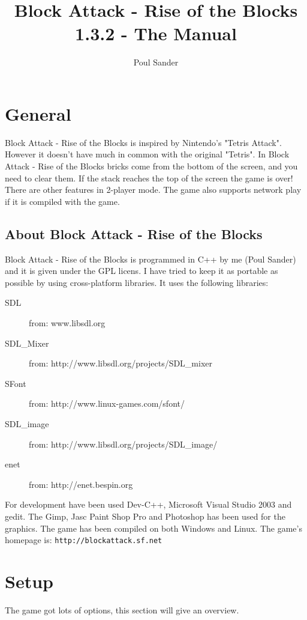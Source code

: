 \documentclass[11pt,a4paper]{article}
\begin{document}
\title{Block Attack - Rise of the Blocks 1.3.2 - The Manual}
\author{Poul Sander}
\maketitle
\tableofcontents
\section{General}
Block Attack - Rise of the Blocks is inspired by Nintendo's
"Tetris Attack". However it doesn't have much in common with the
original "Tetris". In Block Attack - Rise of the Blocks bricks
come from the bottom of the screen, and you need to clear them. If
the stack reaches the top of the screen the game is over! There
are other features in 2-player mode. The game also supports network play 
if it is compiled with the game.
\subsection{About Block Attack - Rise of the Blocks}
Block Attack - Rise of the Blocks is programmed in C++ by me (Poul
Sander) and it is given under the GPL licens. I have tried to keep
it as portable as possible by using cross-platform libraries. It
uses the following libraries:
\begin{description}
\item[SDL] from: \newline www.libsdl.org \item[SDL\_Mixer] from:
\newline http://www.libsdl.org/projects/SDL\_mixer \item[SFont]
from: \newline http://www.linux-games.com/sfont/ \item[SDL\_image]
from: \newline http://www.libsdl.org/projects/SDL\_image/
\item[enet] from: \newline http://enet.bespin.org
\end{description}
For development have been used Dev-C++, Microsoft Visual Studio
2003 and gedit. The Gimp, Jasc Paint Shop Pro and Photoshop has been used for the graphics. The
game has been compiled on both Windows and Linux. \newline The
game's homepage is:
\verb+http://blockattack.sf.net+
\section{Setup}
The game got lots of options, this section will give an overview.
\end{document}
